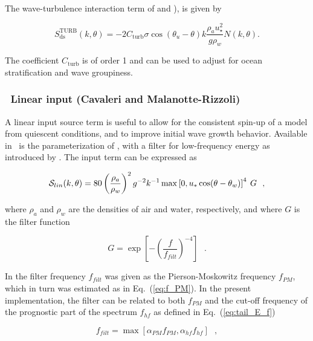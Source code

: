 The wave-turbulence interaction term of \cite{art:TB02} and \cite{art:AJ06}),
is given by

\begin{equation}
S_{\mathrm{ds}}^{\mathrm{TURB}}\left(k,\theta\right) = - 2
C_{\mathrm{turb}} \sigma \cos(\theta_u - \theta) k \frac{\rho_a
u_\star^2}{g \rho_w}  N\left(k,\theta\right) .
\end{equation}

\noindent
The coefficient $C_{\mathrm{turb}}$ is of order 1 and can be used to adjust for
ocean stratification and wave groupiness.


\vsssub
\subsubsection{~Linear input (Cavaleri and Malanotte-Rizzoli)} \label{sec:c&mr}
\vsssub

A linear input source term is useful to allow for the consistent spin-up of a
model from quiescent conditions, and to improve initial wave growth
behavior. Available in \ws\ is the parameterization of \cite{art:CMR81}, with
a filter for low-frequency energy as introduced by \cite{tol:JPO92}. The input
term can be expressed as

\begin{equation}
{\cal S}_{lin}(k,\theta) = 80 \left( \frac{\rho_a}{\rho_w} \right ) ^2
  g^{-2}  k^{-1} \max \left [ 0 , u_* \cos (\theta - \theta_w) \right ]^4 \: G
   \:\:\: , \label{eq:CMR81}
\end{equation}

\noindent
where $\rho_a$ and $\rho_w$ are the densities of air and water, respectively,
and where $G$ is the filter function

\begin{equation}
G = \exp \left [ - \left ( \frac{f}{f_{filt}} \right ) ^{-4} \right ]
\:\:\: . \label{eq:GSln}
\end{equation}

\noindent
In \cite {tol:JPO92} the filter frequency $f_{filt}$ was given as the
Pierson-Moskowitz frequency $f_{PM}$, which in turn was estimated as in
Eq.~(\ref{eq:f_PM}).  In the present implementation, the filter can be related
to both $f_{PM}$ and the cut-off frequency of the prognostic part of the
spectrum $f_{hf}$ as defined in Eq.~(\ref{eq:tail_E_f})

\begin{equation}
f_{filt} = \max \left [ \alpha_{PM} f_{PM} , \alpha_{hf} f_{hf} \right ]
\:\:\: ,
\end{equation}

